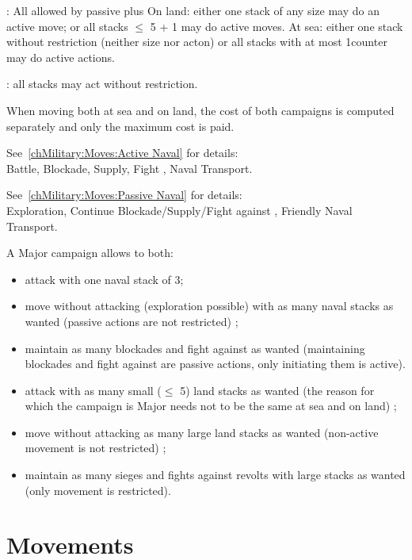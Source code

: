 \ducats: All allowed by passive plus
\bparag On land: either one stack of any size may do an active move;
or all stacks $\leq$ 5 \LD + 1 \Pasha may do active moves.
\bparag At sea: either one stack without restriction (neither size nor acton)
or all stacks with at most 1\FLEET counter may do active actions.

\ducats: all stacks may act without restriction.

\aparag When moving both at sea and on land, the cost of both campaigns is
computed separately and only the maximum cost is paid.

 See~\ref{chMilitary:Moves:Active Naval}
for details:\\
Battle, Blockade, Supply, Fight \corsaire, Naval Transport.

 See~\ref{chMilitary:Moves:Passive Naval}
for details:\\
Exploration, Continue Blockade/Supply/Fight against \corsaire, Friendly Naval
Transport.

\begin{exemple}
  A Major campaign allows to both:
  \begin{itemize}
  \item attack with one naval stack of 3\FLEET ;
  \item move without attacking (exploration possible) with as many naval
    stacks as wanted (passive actions are not restricted) ;
  \item maintain as many blockades and fight against \corsaire as wanted
    (maintaining blockades and fight against \corsaire are passive actions,
    only initiating them is active).
  \item attack with as many small ($\leq$ 5\LD) land stacks as wanted (the
    reason for which the campaign is Major needs not to be the same at sea and
    on land) ;
  \item move without attacking as many large land stacks as wanted
    (non-active movement is not restricted) ;
  \item maintain as many sieges and fights against revolts with large stacks as
    wanted (only movement is restricted).
  \end{itemize}
\end{exemple}

\section{Movements}
\label{chMilitary:Movements}
